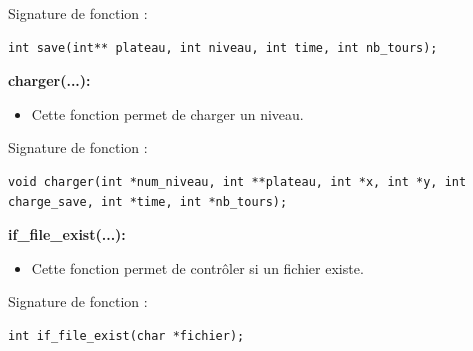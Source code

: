 \documentclass[12pt,french]{article}
\begin{document}
Signature de fonction :
\begin{lstlisting}
int save(int** plateau, int niveau, int time, int nb_tours);
\end{lstlisting}

\textbf{charger(...):}
\begin{itemize}
\item Cette fonction permet de charger un niveau.
\end{itemize}

Signature de fonction :
\begin{lstlisting}
void charger(int *num_niveau, int **plateau, int *x, int *y, int charge_save, int *time, int *nb_tours);
\end{lstlisting}

\textbf{if\_file\_exist(...):}
\begin{itemize}
\item Cette fonction permet de contrôler si un fichier existe.
\end{itemize}

Signature de fonction :
\begin{lstlisting}
int if_file_exist(char *fichier);
\end{lstlisting}
\newpage
\end{document}
